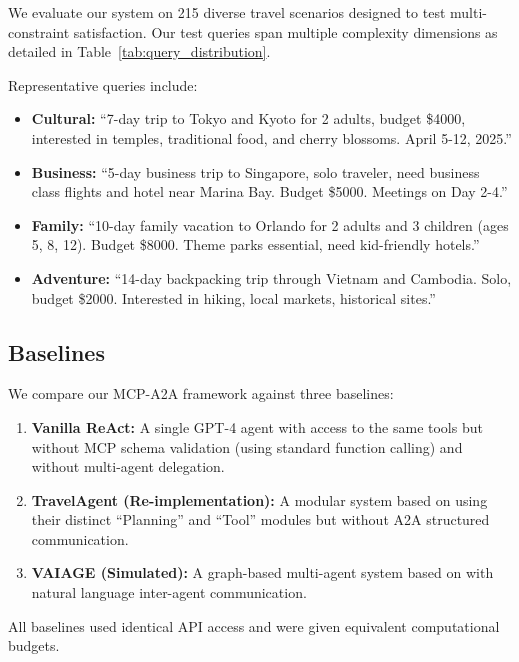\documentclass[preprint,review,12pt]{elsarticle}
\begin{document}
We evaluate our system on 215 diverse travel scenarios designed to test multi-constraint satisfaction. Our test queries span multiple complexity dimensions as detailed in Table~\ref{tab:query_distribution}.

Representative queries include:

\begin{itemize}
    \item \textbf{Cultural:} ``7-day trip to Tokyo and Kyoto for 2 adults, budget \$4000, interested in temples, traditional food, and cherry blossoms. April 5-12, 2025.''
    \item \textbf{Business:} ``5-day business trip to Singapore, solo traveler, need business class flights and hotel near Marina Bay. Budget \$5000. Meetings on Day 2-4.''
    \item \textbf{Family:} ``10-day family vacation to Orlando for 2 adults and 3 children (ages 5, 8, 12). Budget \$8000. Theme parks essential, need kid-friendly hotels.''
    \item \textbf{Adventure:} ``14-day backpacking trip through Vietnam and Cambodia. Solo, budget \$2000. Interested in hiking, local markets, historical sites.''
\end{itemize}

\subsection{Baselines}

We compare our MCP-A2A framework against three baselines:

\begin{enumerate}
    \item \textbf{Vanilla ReAct:} A single GPT-4 agent with access to the same tools but without MCP schema validation (using standard function calling) and without multi-agent delegation.
    
    \item \textbf{TravelAgent (Re-implementation):} A modular system based on \citet{chen2024travelagent} using their distinct ``Planning'' and ``Tool'' modules but without A2A structured communication.
    
    \item \textbf{VAIAGE (Simulated):} A graph-based multi-agent system based on \citet{ge2025vaiage} with natural language inter-agent communication.
\end{enumerate}

All baselines used identical API access and were given equivalent computational budgets.
\end{document}
